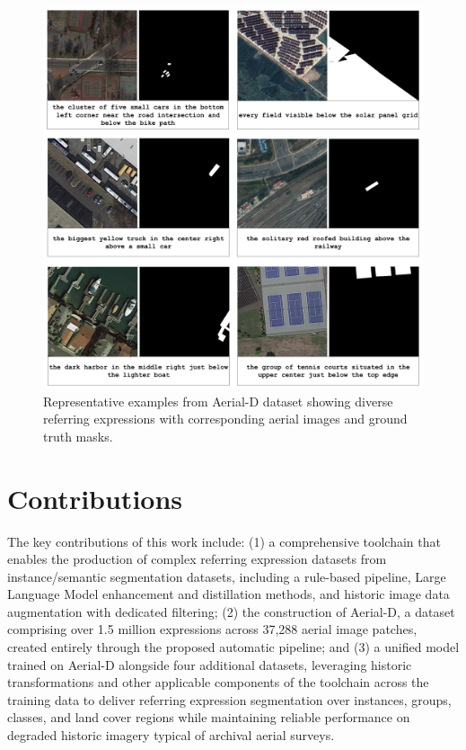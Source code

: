 \begin{figure}[t]
\centering
\includegraphics[width=\textwidth]{Images/6samples.png}
\caption{Representative examples from Aerial-D dataset showing diverse referring expressions with corresponding aerial images and ground truth masks.}
\label{fig:dataset_examples_intro}
\end{figure}

\section{Contributions}

The key contributions of this work include: (1) a comprehensive toolchain that enables the production of complex referring expression datasets from instance/semantic segmentation datasets, including a rule-based pipeline, Large Language Model enhancement and distillation methods, and historic image data augmentation with dedicated filtering; (2) the construction of Aerial-D, a dataset comprising over 1.5 million expressions across 37,288 aerial image patches, created entirely through the proposed automatic pipeline; and (3) a unified model trained on Aerial-D alongside four additional datasets, leveraging historic transformations and other applicable components of the toolchain across the training data to deliver referring expression segmentation over instances, groups, classes, and land cover regions while maintaining reliable performance on degraded historic imagery typical of archival aerial surveys.
